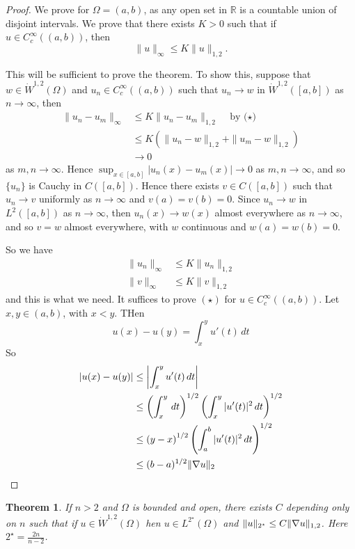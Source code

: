 \documentclass[10pt, oneside, reqno]{amsart}
\theoremstyle{plain}%
\newtheorem{thm}{Theorem}[section]
\numberwithin{equation}{section}
\theoremstyle{definition}
\theoremstyle{remark}
\newcommand{\R}{\mathbb{R}}
\begin{document}
\begin{proof}
	We prove for $\Omega = (a, b)$, as any open set in $\R$ is a countable union of disjoint intervals.  We prove that there exists $K > 0$ such that if $u \in C^\infty_c((a, b))$, then 
	\[
		\| u \|_\infty \leq K \| u \|_{1, 2}.
		\tag{$\star$}
	\]  
	
	This will be sufficient to prove the theorem.  To show this, suppose that $w \in \dot W^{1, 2}(\Omega)$ and $u_n \in C^\infty_c((a,b))$ such that $u_n \rightarrow w$ in $\dot W^{1, 2}([a,b])$ as $n \rightarrow \infty$, then \begin{align*}
		\| u_n - u_m \|_\infty &\leq K \| u_n - u_m \|_{1, 2} \quad \text{by ($\star$)}\\
		&\leq K \left( \| u_n - w \|_{1, 2} + \| u_m - w \|_{1, 2} \right) \\
		&\rightarrow 0 
	\end{align*} as $m, n \rightarrow \infty$.  Hence $\sup_{x \in [a, b]} |u_n(x) - u_m(x)| \rightarrow 0$ as $m, n \rightarrow \infty$, and so $\{ u_n \}$ is Cauchy in $C([a, b])$.  Hence there exists $v \in C([a, b])$ such that $u_n \rightarrow v$ uniformly as $n \rightarrow \infty$ and $v(a) = v(b) = 0$.  Since $u_n \rightarrow w$ in $L^2([a,b])$ as $n \rightarrow \infty$, then $u_n(x) \rightarrow w(x)$ almost everywhere as $n \rightarrow \infty$, and so $v = w$ almost everywhere, with $w$ continuous and $w(a) = w(b) = 0$. 
	
	So we have \begin{align*}
		\| u_n \|_\infty &\leq K \| u_n \|_{1, 2} \\
		\| v \|_\infty &\leq K \| v \|_{1, 2}
	\end{align*} and this is what we need.  It suffices to prove $(\star)$ for $u \in C^\infty_c((a,b))$.  Let $x, y \in (a, b)$, with $x < y$.  THen \[
		u(x) - u(y) = \int_x^y u'(t) \, dt
	\]  So \begin{align*}
		|u(x) - u(y) | &\leq \left| \int_x^y u'(t) \, dt \right| \\
		&\leq \left( \int_x^y \, dt \right)^{1/2} \left( \int_x^y |u'(t)|^2 \, dt \right)^{1/2} \\
		&\leq \left(y-x\right)^{1/2} \left( \int_a^b |u'(t)|^2 \, dt \right)^{1/2} \\
		&\leq (b-a)^{1/2} \| \nabla u \|_2
	\end{align*} 
\end{proof}

\begin{thm}
	\label{thm:his_thm_7.3}
	If $n > 2$ and $\Omega$ is bounded and open, there exists $C$ depending only on $n$ such that if $u \in \dot W^{1, 2}(\Omega)$ hen $u \in L^{2^\star}(\Omega)$ and $\| u \|_{2^\star} \leq C \| \nabla u \|_{1, 2}$.  Here $2^\star = \frac{2n}{n-2}$.   
\end{thm}
\end{document}
